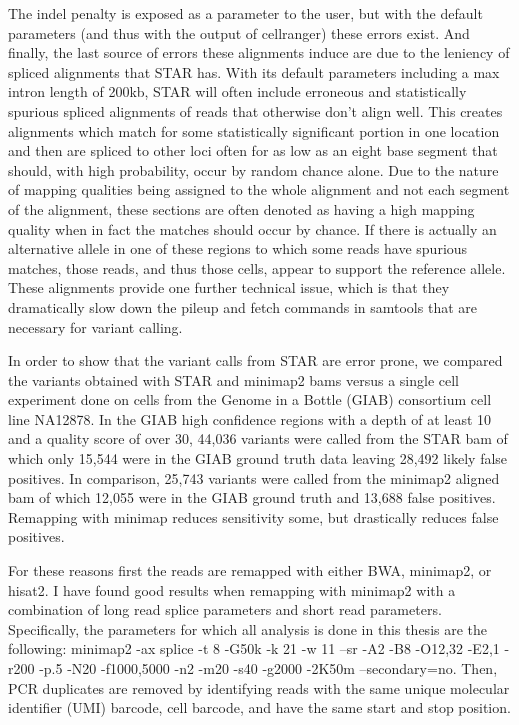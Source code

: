 \par{
The indel penalty is exposed as a parameter to the user, but with the default parameters (and thus with the output of cellranger) these errors exist. 
And finally, the last source of errors these alignments induce are due to the leniency of spliced alignments that STAR has. With its default parameters including 
a max intron length of 200kb, STAR will often include erroneous and statistically spurious spliced alignments of reads that otherwise don't align well. This creates alignments 
which match for some statistically significant portion in one location and then are spliced to other loci often for as low as an eight base segment that should, with high probability, occur by 
random chance alone. Due to the nature of mapping qualities being assigned to the whole alignment and not each segment of the alignment, these sections are often denoted as 
having a high mapping quality when in fact the matches should occur by chance. If there is actually an alternative allele in one of these regions to which some reads have 
spurious matches, those reads, and thus those cells, appear to support the reference allele. These alignments provide one further technical 
issue, which is that they dramatically slow down the pileup and fetch commands in samtools\cite{samtools} that are necessary for variant calling. 
} 

\par{
In order to show that the variant calls from STAR are error prone, we compared the variants obtained with STAR and minimap2 bams versus a single cell experiment done on cells from the Genome in a Bottle (GIAB) consortium cell line NA12878. In the GIAB high confidence regions with a depth of at least 10 and a quality score of over 30, 44,036 variants were called from the STAR bam of which only 15,544 were in the GIAB ground truth data leaving 28,492 likely false positives. In comparison, 25,743 variants were called from the minimap2 aligned bam of which 12,055 were in the GIAB ground truth and 13,688 false positives. Remapping with minimap reduces sensitivity some, but drastically reduces false positives.
}

\par{
For these reasons first the reads are remapped with either BWA, minimap2, or hisat2. I have found good results when remapping with minimap2 with a combination 
of long read splice parameters and short read parameters. Specifically, the parameters for which all analysis is done in this thesis are the following: 
minimap2 -ax splice -t 8 -G50k -k 21 -w 11 --sr -A2 -B8 -O12,32 -E2,1 -r200 -p.5 -N20 -f1000,5000 -n2 -m20 -s40 -g2000 -2K50m --secondary=no. Then, PCR duplicates are removed by identifying reads with the same unique molecular identifier (UMI) barcode, cell barcode, and have the same start and stop position.
}


